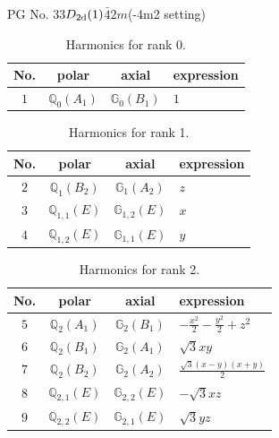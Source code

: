 \documentclass[fleqn,8pt,landscape]{jsarticle}
\begin{document}
\setcounter{MaxMatrixCols}{32}

\renewcommand{\tablename}{Table~}
\renewcommand{\figurename}{Figure~}
\begin{center}
\LARGE
PG No. 33\quad$D_{\rm 2d}(1)$\quad$\bar{4}2m$\quad(-4m2 setting)\quad[ tetragonal ]
\end{center}
\begin{table}[ht!]
\begin{center}
\caption{Harmonics for rank 0.}
\renewcommand{\arraystretch}{1.3}
\begin{tabular}{cccl} \hline \hline
No. & polar & axial & expression \\ \hline
$ 1 $ & $ \mathbb{Q}_{0}(A_{1}) $ & $ \mathbb{G}_{0}(B_{1}) $ & $ 1 $ \\
 \hline \hline
\end{tabular}
\end{center}
\end{table}
\begin{table}[ht!]
\begin{center}
\caption{Harmonics for rank 1.}
\renewcommand{\arraystretch}{1.3}
\begin{tabular}{cccl} \hline \hline
No. & polar & axial & expression \\ \hline
$ 2 $ & $ \mathbb{Q}_{1}(B_{2}) $ & $ \mathbb{G}_{1}(A_{2}) $ & $ z $ \\
$ 3 $ & $ \mathbb{Q}_{1,1}(E) $ & $ \mathbb{G}_{1,2}(E) $ & $ x $ \\
$ 4 $ & $ \mathbb{Q}_{1,2}(E) $ & $ \mathbb{G}_{1,1}(E) $ & $ y $ \\
 \hline \hline
\end{tabular}
\end{center}
\end{table}
\begin{table}[ht!]
\begin{center}
\caption{Harmonics for rank 2.}
\renewcommand{\arraystretch}{1.3}
\begin{tabular}{cccl} \hline \hline
No. & polar & axial & expression \\ \hline
$ 5 $ & $ \mathbb{Q}_{2}(A_{1}) $ & $ \mathbb{G}_{2}(B_{1}) $ & $ - \frac{x^{2}}{2} - \frac{y^{2}}{2} + z^{2} $ \\
$ 6 $ & $ \mathbb{Q}_{2}(B_{1}) $ & $ \mathbb{G}_{2}(A_{1}) $ & $ \sqrt{3} x y $ \\
$ 7 $ & $ \mathbb{Q}_{2}(B_{2}) $ & $ \mathbb{G}_{2}(A_{2}) $ & $ \frac{\sqrt{3} \left(x - y\right) \left(x + y\right)}{2} $ \\
$ 8 $ & $ \mathbb{Q}_{2,1}(E) $ & $ \mathbb{G}_{2,2}(E) $ & $ - \sqrt{3} x z $ \\
$ 9 $ & $ \mathbb{Q}_{2,2}(E) $ & $ \mathbb{G}_{2,1}(E) $ & $ \sqrt{3} y z $ \\
 \hline \hline
\end{tabular}
\end{center}
\end{table}
\end{document}
